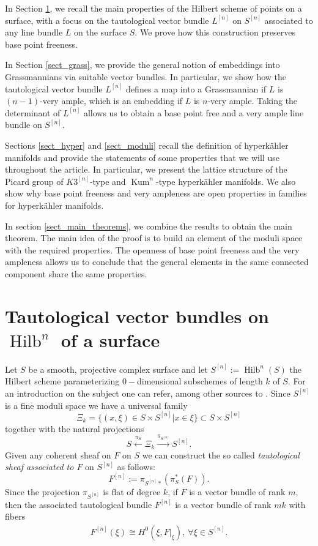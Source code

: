 \documentclass{article}
\DeclareMathOperator{\Hilb}{Hilb}
\DeclareMathOperator{\Kum}{Kum}
\newcommand{\hilb}[2][n]{#2^{[#1]}}
\begin{document}
In Section \ref{sect_tautological}, we recall the main properties of the Hilbert scheme of points on a surface, with a focus on the tautological vector bundle $\hilb{L}$ on $\hilb{S}$ associated to any line bundle $L$ on the surface $S$. We prove how this construction preserves base point freeness. 

In Section \ref{sect_grass}, we provide the general notion of embeddings into Grassmannians via suitable vector bundles. In particular, we show how the tautological vector bundle $\hilb{L}$ defines a map into a Grassmannian if $L$ is $(n-1)$-very ample, which is an embedding if $L$ is $n$-very ample. Taking the determinant of $\hilb{L}$ allows us to obtain a base point free and a very ample line bundle on $\hilb{S}$.

Sections \ref{sect_hyper} and \ref{sect_moduli} recall the definition of hyperk\"ahler manifolds and provide the statements of some properties that we will use throughout the article. In particular, we present the lattice structure of the Picard group of $\hilb{K3}$-type and $\Kum^n$-type hyperk\"ahler manifolds. We also show why base point freeness and very ampleness are open properties in families for hyperk\"ahler manifolds.

In section \ref{sect_main_theorems}, we combine the results to obtain the main theorem. The main idea of the proof is to build an element of the moduli space with the required properties. The openness of base point freeness and the very ampleness allows us to conclude that the general elements in the same connected component share the same properties. 

\section{Tautological vector bundles on $\Hilb^n$ of a surface}\label{sect_tautological}

Let $S$ be a smooth, projective complex surface and let $\hilb{S}:=\Hilb^n(S)$ the Hilbert scheme parameterizing $0-$dimensional subschemes of length $k$ of $S$. For an introduction on the subject one can refer, among other sources to \cite{nakajima_hilbert_schemes}.  Since $\hilb{S}$ is a fine moduli space we have a universal family $$\Xi_k=\{(x,\xi)\in S\times \hilb{S}|x\in \xi\}\subset S\times \hilb{S}$$ together with the natural projections $$S\xleftarrow{\pi_S}\Xi_k\xrightarrow{\pi_{\hilb{S}}}\hilb{S}.$$
Given any coherent sheaf on $F$ on $S$ we can construct the so called \emph{tautological sheaf associated to $F$} on $\hilb{S}$ as follows: $$\hilb{F}:=\pi_{\hilb{S}*}(\pi^*_S(F)).$$
Since the projection $\pi_{\hilb{S}}$ is flat of degree $k$, if $F$ is a vector bundle of rank $m$,  then the associated tautological bundle $\hilb{F}$ is a vector bundle of rank $mk$ with fibers
\begin{align}\label{eq_fiber_of_F^[n]}
    \hilb{F}(\xi)\cong H^0(\xi,F|_\xi),\ \forall \xi\in\hilb{S}.
\end{align}
\end{document}

